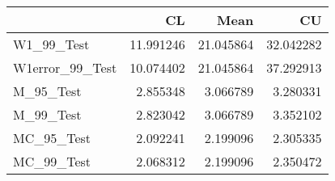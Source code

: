 \begin{tabular}{lrrr}
\toprule
{} &         CL &       Mean &         CU \\
\midrule
W1\_99\_Test      &  11.991246 &  21.045864 &  32.042282 \\
W1error\_99\_Test &  10.074402 &  21.045864 &  37.292913 \\
M\_95\_Test       &   2.855348 &   3.066789 &   3.280331 \\
M\_99\_Test       &   2.823042 &   3.066789 &   3.352102 \\
MC\_95\_Test      &   2.092241 &   2.199096 &   2.305335 \\
MC\_99\_Test      &   2.068312 &   2.199096 &   2.350472 \\
\bottomrule
\end{tabular}
